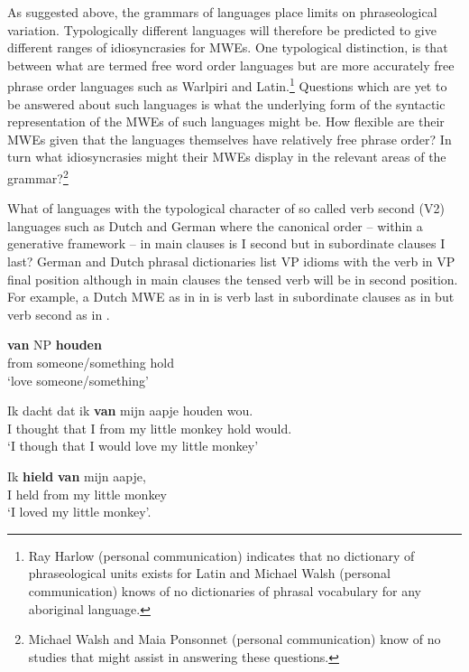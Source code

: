 \documentclass[output=paper]{langsci/langscibook}
\begin{document}
As suggested above, the grammars of languages place limits on phraseological variation. Typologically different languages will therefore be predicted to give different ranges of idiosyncrasies for MWEs. One typological distinction, is that between what are termed free word order languages but are more accurately free phrase order languages such as Warlpiri  and Latin.\footnote{Ray Harlow (personal communication) indicates that no dictionary of  phraseological units exists for Latin and Michael Walsh (personal communication) knows of no dictionaries of phrasal vocabulary for any aboriginal language.}  Questions which are yet to be answered about such languages is what the underlying form of the syntactic representation of the MWEs of such languages might be. How flexible are their MWEs given that the languages themselves have relatively free phrase order? In turn what idiosyncrasies might their MWEs display in the relevant areas of the grammar?\footnote{Michael Walsh and Maia Ponsonnet (personal communication) know of no studies that might assist in answering these questions.}

What of languages with the typological character of so called verb second (V2) languages such as Dutch and German where the canonical order -- within a generative framework -- in main clauses is I second but in subordinate clauses I last? German and Dutch phrasal dictionaries list VP idioms with the verb in VP final position although in main clauses the tensed verb will be in second position. For example, a Dutch MWE as in in  is verb last in subordinate clauses as in  but verb second as in .

\ea\label{ex:ex50}
\gll \textbf{van} NP \textbf{houden}\\
             from someone/something hold\\
\glt ‘love someone/something’
\z


\ea\label{ex:ex51}
\gll   Ik  dacht    dat  ik \textbf{van} mijn aapje houden  wou. \\
I   thought that I  from my  {little monkey} hold      would. \\
\glt ‘I though that I would love my little monkey’
\z

\ea\label{ex:ex52}
\gll Ik \textbf{hield} \textbf{van} mijn aapje,\\
I  held  from my  {little monkey}\\
\glt ‘I loved my little monkey’. 
\z
\end{document}
